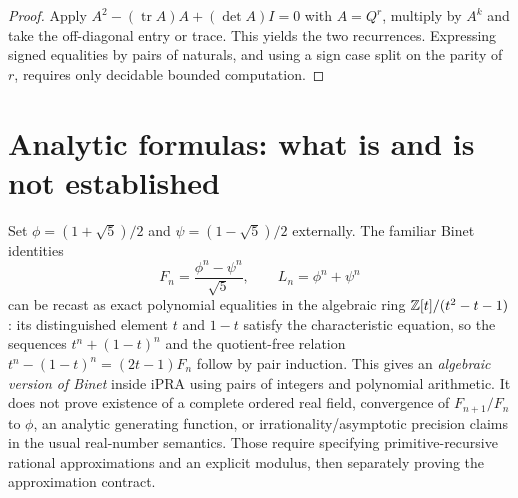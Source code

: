 \documentclass[11pt]{article}
\begin{document}
\begin{proof}
Apply $A^2-(\operatorname{tr}A)A+(\det A)I=0$ with $A=Q^r$, multiply by $A^k$ and take the off-diagonal entry or trace. This yields the two recurrences. Expressing signed equalities by pairs of naturals, and using a sign case split on the parity of $r$, requires only decidable bounded computation.
\end{proof}

\section{Analytic formulas: what is and is not established}
Set $\phi=(1+\sqrt5)/2$ and $\psi=(1-\sqrt5)/2$ externally. The familiar Binet identities
\[F_n=\frac{\phi^n-\psi^n}{\sqrt5},\qquad L_n=\phi^n+\psi^n\tag{21}\]
can be recast as exact polynomial equalities in the algebraic ring $\mathbb Z[t]/(t^2-t-1)$: its distinguished element $t$ and $1-t$ satisfy the characteristic equation, so the sequences $t^n+(1-t)^n$ and the quotient-free relation $t^n-(1-t)^n=(2t-1)F_n$ follow by pair induction. This gives an \emph{algebraic version of Binet} inside iPRA using pairs of integers and polynomial arithmetic. It does not prove existence of a complete ordered real field, convergence of $F_{n+1}/F_n$ to $\phi$, an analytic generating function, or irrationality/asymptotic precision claims in the usual real-number semantics. Those require specifying primitive-recursive rational approximations and an explicit modulus, then separately proving the approximation contract.
\end{document}
